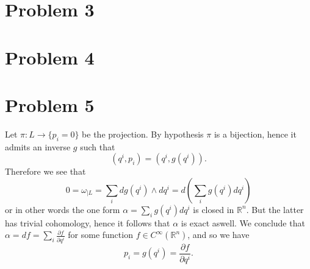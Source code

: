 \documentclass[]{article}
\newcommand{\D}[2]{\frac{\partial #1}{\partial #2}}
\begin{document}
\section{Problem 3}



\section{Problem 4}



\section{Problem 5}

Let $\pi:L\to \{p_i=0\}$ be the projection. By hypothesis $\pi$ is a bijection, hence it admits an inverse $g$ such that 
$$ (q^i,p_i) = (q^i,g(q^i)). $$ 
Therefore we see that $$ 0=\omega_{|L} = \sum_i dg(q^i)\wedge dq^i = d(\sum_i g(q^i)dq^i) $$ or in other words the one form $\alpha = \sum_i g(q^i)dq^i $ is closed in $\mathbb{R}^n$. But the latter has trivial cohomology, hence it follows that $\alpha$ is exact aswell. We conclude that $ \alpha = df =\sum_i \D{f}{q^i} $ for some function $f \in C^{\infty}(\mathbb{R}^n)$, and so we have $$ p_i = g(q^i) = \D{f}{q^i}. $$
\end{document}

